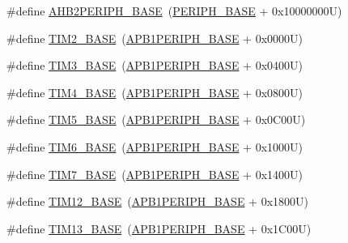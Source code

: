 \begin{DoxyCompactItemize}
\item 
\#define \hyperlink{group___peripheral__registers__structures_gaeedaa71d22a1948492365e2cd26cfd46}{A\+H\+B2\+P\+E\+R\+I\+P\+H\+\_\+\+B\+A\+SE}~(\hyperlink{group___peripheral__memory__map_ga9171f49478fa86d932f89e78e73b88b0}{P\+E\+R\+I\+P\+H\+\_\+\+B\+A\+SE} + 0x10000000\+U)
\item 
\#define \hyperlink{group___peripheral__registers__structures_ga00d0fe6ad532ab32f0f81cafca8d3aa5}{T\+I\+M2\+\_\+\+B\+A\+SE}~(\hyperlink{group___peripheral__memory__map_ga45666d911f39addd4c8c0a0ac3388cfb}{A\+P\+B1\+P\+E\+R\+I\+P\+H\+\_\+\+B\+A\+SE} + 0x0000\+U)
\item 
\#define \hyperlink{group___peripheral__registers__structures_gaf0c34a518f87e1e505cd2332e989564a}{T\+I\+M3\+\_\+\+B\+A\+SE}~(\hyperlink{group___peripheral__memory__map_ga45666d911f39addd4c8c0a0ac3388cfb}{A\+P\+B1\+P\+E\+R\+I\+P\+H\+\_\+\+B\+A\+SE} + 0x0400\+U)
\item 
\#define \hyperlink{group___peripheral__registers__structures_ga56e2d44b0002f316527b8913866a370d}{T\+I\+M4\+\_\+\+B\+A\+SE}~(\hyperlink{group___peripheral__memory__map_ga45666d911f39addd4c8c0a0ac3388cfb}{A\+P\+B1\+P\+E\+R\+I\+P\+H\+\_\+\+B\+A\+SE} + 0x0800\+U)
\item 
\#define \hyperlink{group___peripheral__registers__structures_ga3e1671477190d065ba7c944558336d7e}{T\+I\+M5\+\_\+\+B\+A\+SE}~(\hyperlink{group___peripheral__memory__map_ga45666d911f39addd4c8c0a0ac3388cfb}{A\+P\+B1\+P\+E\+R\+I\+P\+H\+\_\+\+B\+A\+SE} + 0x0\+C00\+U)
\item 
\#define \hyperlink{group___peripheral__registers__structures_ga8268ec947929f192559f28c6bf7d1eac}{T\+I\+M6\+\_\+\+B\+A\+SE}~(\hyperlink{group___peripheral__memory__map_ga45666d911f39addd4c8c0a0ac3388cfb}{A\+P\+B1\+P\+E\+R\+I\+P\+H\+\_\+\+B\+A\+SE} + 0x1000\+U)
\item 
\#define \hyperlink{group___peripheral__registers__structures_ga0ebf54364c6a2be6eb19ded6b18b6387}{T\+I\+M7\+\_\+\+B\+A\+SE}~(\hyperlink{group___peripheral__memory__map_ga45666d911f39addd4c8c0a0ac3388cfb}{A\+P\+B1\+P\+E\+R\+I\+P\+H\+\_\+\+B\+A\+SE} + 0x1400\+U)
\item 
\#define \hyperlink{group___peripheral__registers__structures_ga33dea32fadbaecea161c2ef7927992fd}{T\+I\+M12\+\_\+\+B\+A\+SE}~(\hyperlink{group___peripheral__memory__map_ga45666d911f39addd4c8c0a0ac3388cfb}{A\+P\+B1\+P\+E\+R\+I\+P\+H\+\_\+\+B\+A\+SE} + 0x1800\+U)
\item 
\#define \hyperlink{group___peripheral__registers__structures_gad20f79948e9359125a40bbf6ed063590}{T\+I\+M13\+\_\+\+B\+A\+SE}~(\hyperlink{group___peripheral__memory__map_ga45666d911f39addd4c8c0a0ac3388cfb}{A\+P\+B1\+P\+E\+R\+I\+P\+H\+\_\+\+B\+A\+SE} + 0x1\+C00\+U)

\end{DoxyCompactItemize}
